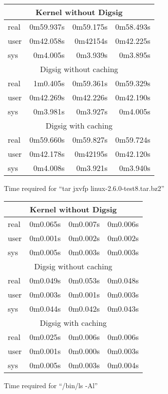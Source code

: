 \documentclass{article}
\begin{document}
\begin{figure}
\begin{center}
\begin{tabular}{|l|r|r|r|}
\hline
\multicolumn{4}{|c|}{Kernel without Digsig} \\
\hline
	real  &  0m59.937s &0m59.175s &0m58.493s \\
	user  &  0m42.058s &0m42154s &0m42.225s \\
	sys   &  0m4.005s  &0m3.939s  &0m3.895s \\
\hline
\multicolumn{4}{|c|}{Digsig without caching} \\
\hline
	real  &  1m0.405s  & 0m59.361s & 0m59.329s \\
	user  &  0m42.269s & 0m42.226s & 0m42.190s \\
	sys   &  0m3.981s  & 0m3.927s  & 0m4.005s \\
\hline
\multicolumn{4}{|c|}{Digsig with caching} \\
\hline
	real  &  0m59.660s & 0m59.827s & 0m59.724s \\
	user  &  0m42.178s & 0m42195s & 0m42.120s \\
	sys   &  0m4.008s  & 0m3.921s  & 0m3.940s \\
\hline
\end{tabular}
\caption{Time required for ``tar jxvfp linux-2.6.0-test8.tar.bz2''}\label{fig:tartimings}
\end{center}
\end{figure}
\begin{figure}
\begin{center}
\begin{tabular}{|l|r|r|r|}
\hline
\multicolumn{4}{|c|}{Kernel without Digsig} \\
\hline
	real  &  0m0.065s &0m0.007s &0m0.006s \\
	user  &  0m0.001s &0m0.002s &0m0.002s \\
	sys   &  0m0.005s &0m0.003s &0m0.003s \\
\hline
\multicolumn{4}{|c|}{Digsig without caching} \\
\hline
	real  &  0m0.049s &0m0.053s &0m0.048s \\
	user  &  0m0.003s &0m0.001s &0m0.003s \\
	sys   &  0m0.044s &0m0.042s &0m0.043s \\
\hline
\multicolumn{4}{|c|}{Digsig with caching} \\
\hline
	real  &  0m0.025s& 0m0.006s &0m0.006s \\
	user  &  0m0.001s& 0m0.000s &0m0.003s \\
	sys   &  0m0.005s& 0m0.003s &0m0.004s \\
\hline
\end{tabular}
\caption{Time required for ``/bin/ls -Al''}\label{fig:lstimings}
\end{center}
\end{figure}
\end{document}
